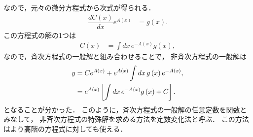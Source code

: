 なので，元々の微分方程式から次式が得られる．
\begin{align}
 \dfrac{dC\left(x\right)}{dx}e^{A\left(x\right)} & =g\left(x\right).
\end{align}
この方程式の解の1つは
\begin{align}
 C\left(x\right) & =\int dx\,e^{-A\left(x\right)}g\left(x\right),
\end{align}
なので，斉次方程式の一般解と組み合わせることで，
非斉次方程式の一般解は
\begin{align}
 y & = C e^{A\left(x\right)} + e^{A\left(x\right)}\int dx\, 
       g\left(x\right) e^{-A\left(x\right)},\notag \\
   & = e^{A\left(x\right)}\left[\int dx\, e^{-A\left(x\right)}g\left(x\right) + C\right]. 
\end{align}
となることが分かった．
このように，斉次方程式の一般解の任意定数を関数とみなして，
非斉次方程式の特殊解を求める方法を定数変化法と呼ぶ．
この方法はより高階の方程式に対しても使える．

